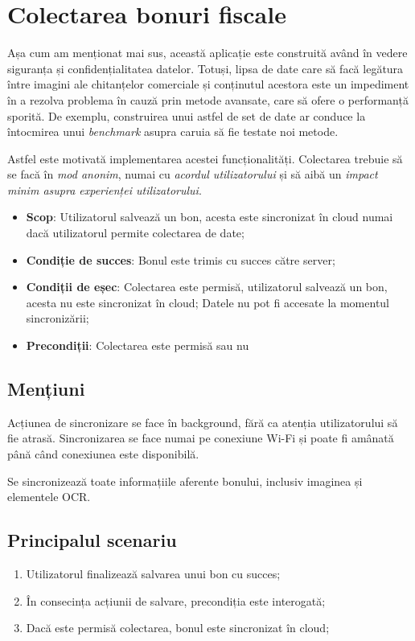 \section{Colectarea bonuri fiscale}\label{spec:collecting}

Așa cum am menționat mai sus, această aplicație este construită având în vedere siguranța și confidențialitatea datelor. Totuși, lipsa de date care să facă legătura între imagini ale chitanțelor comerciale și conținutul acestora este un impediment în a rezolva problema în cauză prin metode avansate, care să ofere o performanță sporită. De exemplu, construirea unui astfel de set de date ar conduce la întocmirea unui \emph{benchmark} asupra caruia să fie testate noi metode. 

Astfel este motivată implementarea acestei funcționalități. Colectarea trebuie să se facă în \emph{mod anonim}, numai cu \emph{acordul utilizatorului} și să aibă un \emph{impact minim asupra experienței utilizatorului}.

\begin{itemize}
\item
  \textbf{Scop}: Utilizatorul salvează un bon, acesta este sincronizat în cloud numai dacă utilizatorul permite colectarea de date;
\item
  \textbf{Condiție de succes}: Bonul este trimis cu succes către server;
\item
  \textbf{Condiții de eșec}: Colectarea este permisă, utilizatorul salvează un bon, acesta nu este sincronizat în cloud; Datele nu pot fi accesate la momentul sincronizării;
\item
  \textbf{Precondiții}: Colectarea este permisă sau nu
\end{itemize}

\subsection*{Mențiuni}\label{menux21biuni-2}

Acțiunea de sincronizare se face în background, fără ca atenția utilizatorului să fie atrasă. Sincronizarea se face numai pe conexiune Wi-Fi și poate fi amânată până când conexiunea este disponibilă.

Se sincronizează toate informațiile aferente bonului, inclusiv imaginea și elementele OCR.

\subsection*{Principalul scenariu}\label{principalul-scenariu-3}

\begin{enumerate}
\item
  Utilizatorul finalizează salvarea unui bon cu succes;
\item
  În consecința acțiunii de salvare, precondiția este interogată;
\item
  Dacă este permisă colectarea, bonul este sincronizat în cloud;
\end{enumerate}
